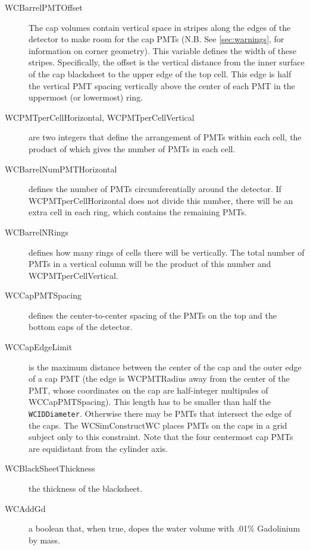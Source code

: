 \begin{description}
\item[WCBarrelPMTOffset] The cap volumes contain vertical space in stripes along the edges of the detector to make room for the cap PMTs (N.B.  See \ref{sec:warnings}, for information on corner geometry). This variable defines the width of these stripes.  Specifically, the offset is the vertical distance from the inner surface of the cap blacksheet to the upper edge of the top cell.  This edge is half the vertical PMT spacing vertically above the center of each PMT in the uppermost (or lowermost) ring.

\item[WCPMTperCellHorizontal, WCPMTperCellVertical] are two integers that define the arrangement of PMTs within each cell, the product of which gives the number of PMTs in each cell.

\item[WCBarrelNumPMTHorizontal] defines the number of PMTs circumferentially around the detector. If WCPMTperCellHorizontal does not divide this number, there will be an extra cell in each ring, which contains the remaining PMTs.

\item[WCBarrelNRings] defines how many rings of cells there will be vertically.  The total number of PMTs in a vertical column will be the product of this number and WCPMTperCellVertical.

\item[WCCapPMTSpacing] defines the center-to-center spacing of the PMTs on the top and the bottom caps of the detector.

\item[WCCapEdgeLimit] is the maximum distance between the center of the cap and the outer edge of a cap PMT (the edge is WCPMTRadius away from the center of the PMT, whose coordinates on the cap are half-integer multipules of WCCapPMTSpacing). This length has to be smaller than half the \texttt{WCIDDiameter}. Otherwise there may be PMTs that intersect the edge of the caps.  The WCSimConstructWC places PMTs on the caps in a grid subject only to this constraint.  Note that the four centermost cap PMTs are equidistant from the cylinder axis.

\item[WCBlackSheetThickness] the thickness of the blacksheet.

\item[WCAddGd] a boolean that, when true, dopes the water volume with .01\% Gadolinium by mass.
\end {description}

